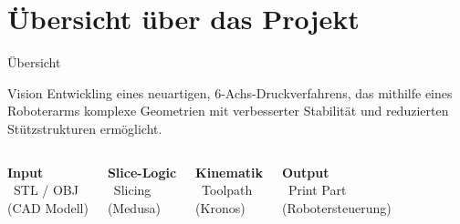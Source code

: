 \section{Übersicht über das Projekt}

\begin{frame}{Übersicht}

    \begin{alertblock}{Vision}
        Entwickling eines neuartigen, 6-Achs-Druckverfahrens, das mithilfe eines Roboterarms 
        komplexe Geometrien mit verbesserter Stabilität und reduzierten Stützstrukturen ermöglicht.
    \end{alertblock}


    \vspace{0.5cm}
    
    \begin{columns}[T]
            \centering
            \textbf{Input}\\
            \vspace{0.2cm}
            \faFileCode[regular] \ STL / OBJ\\
            (CAD Modell)
            
            \centering
            \textbf{Slice-Logic}\\
            \vspace{0.2cm}
            \faCogs \ Slicing\\
            (Medusa)
        
            \centering
            \textbf{Kinematik}\\
            \vspace{0.2cm}
            \faCogs \ Toolpath \\
            (Kronos)

            \centering
            \textbf{Output}\\
            \vspace{0.2cm}
            \faRobot \ Print Part \\
            (Robotersteuerung)
    \end{columns}
\end{frame}

